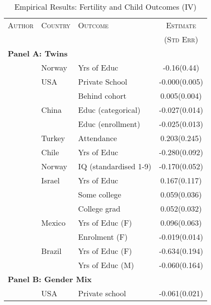 \begin{table}[htpb!]
\caption{Empirical Results: Fertility and Child Outcomes (IV)}
\label{Ftab:childQQ}
\begin{tabular}{lllc} \toprule
\textsc{Author} & \textsc{Country} & \textsc{Outcome} & \textsc{Estimate} \\
                &                  &                  & \textsc{(Std Err)} \\ \midrule
\multicolumn{4}{l}{\textbf{Panel A: Twins}} \\
\citet{Blacketal2005}            &Norway   & Yrs of Educ         &-0.16(0.44) \\
\citet{Caceres2006}              &USA      &Private School       &-0.000(0.005)\\
                                 &         &Behind cohort        & 0.005(0.004)\\
\citet{Lietal2008}               &China    &Educ (categorical)   &-0.027(0.014)\\
                                 &         &Educ (enrollment)    &-0.025(0.013)\\
\citet{Dayiogluetal2009}         &Turkey   &Attendance           & 0.203(0.245)\\
\citet{Sanhueza2009}             &Chile    &Yrs of Educ          &-0.280(0.092)\\
\citet{Blacketal2010}            &Norway   &IQ (standardised 1-9)&-0.170(0.052)\\
\citet{Angristetal2010}          &Israel   &Yrs of Educ          & 0.167(0.117)\\
                                 &         &Some college         & 0.059(0.036)\\
                                 &         &College grad         & 0.052(0.032)\\
\citet{FitzsimonsMalde2010}      &Mexico   &Yrs of Educ (F)      & 0.096(0.063)\\
                                 &         &Enrolment (F)        &-0.019(0.014)\\
\citet{SouzaPonczek2012}         &Brazil   &Yrs of Educ (F)      &-0.634(0.194)\\
                                 &         &Yrs of Educ (M)      &-0.060(0.164)\\ \midrule
\multicolumn{4}{l}{\textbf{Panel B: Gender Mix}} \\
\citet{ConleyGlauber2006}        &USA      &Private school       &-0.061(0.021) \\

\end{tabular}
\end{table}
